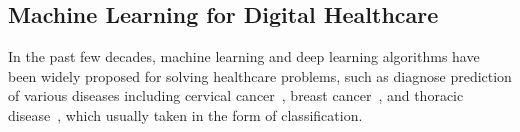 \documentclass{article}
\newcommand*{\1}{\textcolor{red}}
\begin{document}
\begin{comment}
\subsection{TSK+ Fuzzy Inference}\label{sparseFRI}
The Takagi-Sugeno-Kang (TSK) inference system generates a crisp inference result by utilising the weighted average of the sub-consequences based on determined firing strength for all the fired rules~\cite{TSK1985}. Notably, no rule will be fired if a given input does not overlap with any rule antecedent. Thereby, the TSK inference cannot be adopted. TSK+ fuzzy inference~\cite{li2018extended} was proposed to address such an issue which generates a consequence by considering all the rules in the rule base~\cite{Jie2017}. Suppose that a sparse TSK rule base is comprised of  rules:

where  and  represents a normal and convex polygonal fuzzy set that is denoted as (),  is the number of odd points of the fuzzy set. Given an input  in the input domain, a crisp inference result can be generated by the following three steps: \\
\textbf{Step 1}: Identify the matching degrees  between the given input  and rule antecedents () for each rule  by:

where  is a distance factor defined to measure the distance between the given two fuzzy sets, and is computed as:

where  denotes the sensitivity factor, and  represents the Euclidean distance between the two fuzzy sets.  is a positive-real number s.t. . Smaller value of  yields a similarity degree which is more sensitive to the distance of two fuzzy sets, and vice versa. \\
\textbf{Step 2}: Determine the firing degree  of each rule by aggregating the matching degrees between a given input and its antecedent terms via:

where  is a t-norm operator and is implemented as a minimum operator. \\
\textbf{Step 3}: Calculate the final output  by integrating the sub-consequences from all the rules by:

\end{comment}

\subsection{Machine Learning for Digital Healthcare}
In the past few decades, machine learning and deep learning algorithms have been widely proposed for solving healthcare problems, such as diagnose prediction of various diseases including cervical cancer~\cite{ghoneim2020cervical}, breast cancer~\cite{devarriya2020unbalanced}, and thoracic disease~\cite{li2018thoracic}, which usually taken in the form of classification.
\end{document}
